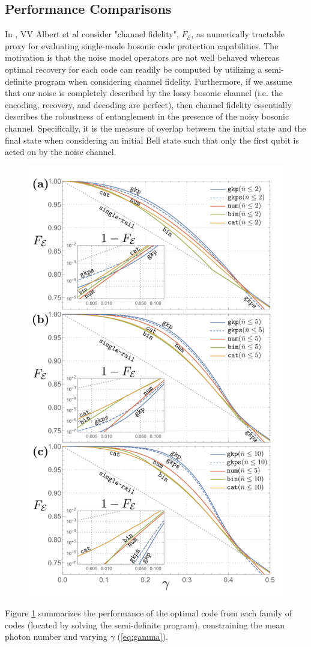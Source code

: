 \documentclass[12]{amsart}
\newcommand\0{\mathbf{0}}
\newcommand\<{\langle}
\renewcommand\>{\rangle}
\begin{document}
\subsection{Performance Comparisons}

In \cite{albert2017performance}, VV Albert et al consider "channel fidelity", $F_\mathcal{E}$,  as numerically tractable proxy for evaluating single-mode bosonic code protection capabilities. The motivation is that the noise model operators are not well behaved whereas optimal recovery for each code can readily be computed by utilizing a semi-definite program when considering channel fidelity. Furthermore, if we assume that our noise is completely described by the lossy bosonic channel (i.e. the encoding, recovery, and decoding are perfect), then channel fidelity essentially describes the robustness of entanglement in the presence of the noisy bosonic channel. Specifically, it is the measure of overlap between the initial state and the final state when considering an initial Bell state such that only the first qubit is acted on by the noise channel.

\begin{figure}[H]
\label{fig:perf}
\centering
\includegraphics[width=0.5\linewidth,keepaspectratio]{fidelity.png}	
\end{figure}

Figure \ref{fig:perf} summarizes the performance of the optimal code from each family of codes (located by solving the semi-definite program), constraining the mean photon number and varying $\gamma$ (\ref{eq:gamma}).
\end{document}
